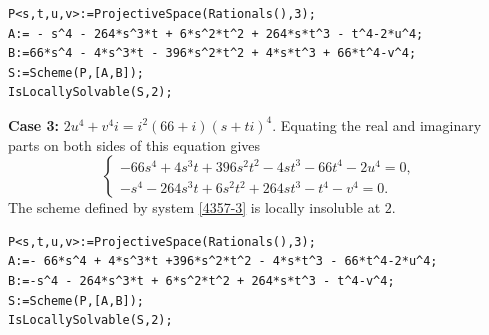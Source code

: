 \documentclass[a4paper,12pt,english,reqno]{amsart}
\begin{document}
\begin{lstlisting}
P<s,t,u,v>:=ProjectiveSpace(Rationals(),3);
A:= - s^4 - 264*s^3*t + 6*s^2*t^2 + 264*s*t^3 - t^4-2*u^4;
B:=66*s^4 - 4*s^3*t - 396*s^2*t^2 + 4*s*t^3 + 66*t^4-v^4;
S:=Scheme(P,[A,B]);
IsLocallySolvable(S,2);
\end{lstlisting}


{\bf Case 3:} $2u^4+v^4i=i^2(66+i)(s+ti)^4$. Equating the real and imaginary parts on both sides of this equation gives
\begin{equation}\label{4357-3}
\begin{cases}
-66s^4 + 4s^3t + 396s^2t^2 - 4st^3 - 66t^4 - 2u^4=0,\\
-s^4 - 264s^3t + 6s^2t^2 + 264st^3 - t^4 - v^4=0.
\end{cases}
\end{equation}
The scheme defined by system \eqref{4357-3} is locally insoluble at $2$.

\begin{lstlisting}
P<s,t,u,v>:=ProjectiveSpace(Rationals(),3);
A:=- 66*s^4 + 4*s^3*t +396*s^2*t^2 - 4*s*t^3 - 66*t^4-2*u^4;
B:=-s^4 - 264*s^3*t + 6*s^2*t^2 + 264*s*t^3 - t^4-v^4;
S:=Scheme(P,[A,B]);
IsLocallySolvable(S,2);
\end{lstlisting}
\end{document}
